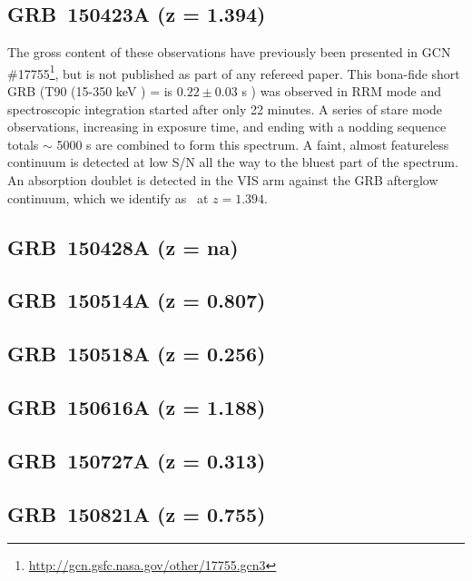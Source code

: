 \documentclass{aa}    %
\begin{document}
\subsection{GRB~150423A (z = 1.394)}	

The gross content of these observations have previously been presented in GCN
\#17755\footnote{\url{http://gcn.gsfc.nasa.gov/other/17755.gcn3}}, but is not
published as part of any refereed paper. This bona-fide short GRB (T90 (15-350
keV ) = is $ 0.22 \pm 0.03$ s \citep{Lien2016}) was observed in RRM mode and
spectroscopic integration started after only 22 minutes. A series of stare mode
observations, increasing in exposure time, and ending with a nodding sequence
totals $\sim$ 5000 s are combined to form this spectrum. A faint, almost
featureless continuum is detected at low S/N all the way to the bluest part of
the spectrum. An absorption doublet is detected in the VIS arm against the GRB
afterglow continuum, which we identify as \mgii~at $z = 1.394$.

\subsection{GRB~150428A (z = na)}	



\subsection{GRB~150514A (z = 0.807)}	



\subsection{GRB~150518A (z = 0.256)}	



\subsection{GRB~150616A (z = 1.188)}	



\subsection{GRB~150727A (z = 0.313)}	



\subsection{GRB~150821A (z = 0.755)}	
\end{document}
